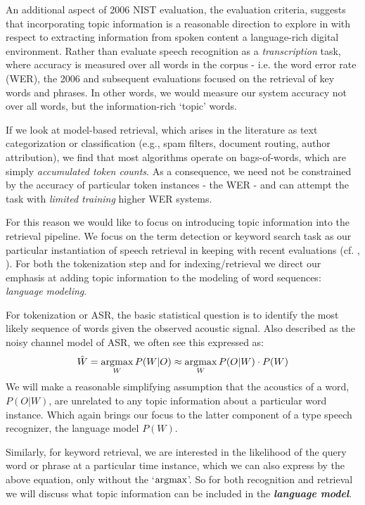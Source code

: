An additional aspect of 2006 NIST evaluation, the evaluation criteria, suggests that incorporating topic information is a reasonable direction to explore in with respect to extracting information from spoken content a language-rich digital environment.  Rather than evaluate speech recognition as a \textit{transcription} task, where accuracy is measured over all words in the corpus - i.e. the word error rate (WER), the 2006 and subsequent evaluations focused on the retrieval of key words and phrases.  In other words, we would measure our system accuracy not over all words, but the information-rich `topic' words.

If we look at model-based retrieval, which arises in the literature as text categorization or classification (e.g., spam filters, document routing, author attribution), we find that most algorithms operate on bags-of-words, which are simply \textit{accumulated token counts}.   As a consequence, we need not be constrained by the accuracy of particular token instances - the WER - and can attempt the task with \textit{limited training} higher WER systems.

For this reason we would like to focus on introducing topic information into the retrieval pipeline.   We focus on the term detection or keyword search task as our particular instantiation of speech retrieval in keeping with recent evaluations (cf. \cite{std06eval}, \cite{babel}).   For both the tokenization step and for indexing/retrieval we direct our emphasis at adding topic information to the modeling of word sequences: \textit{language modeling}.

For tokenization or ASR, the basic statistical question is to identify the most likely sequence of words given the observed acoustic signal.  Also described as the noisy channel model of ASR, we often see this expressed as:
\begin{equation}
\hat{W} = \operatorname*{\arg\!\max}_{W} P(W|O) \approx \operatorname*{\arg\!\max}_{W} P(O|W)\cdot P(W)
\end{equation}
We will make a reasonable simplifying assumption that the acoustics of a word, $P(O|W)$, are unrelated to any topic information about a particular word instance.  Which again brings our focus to the latter component of a type speech recognizer, the language model $P(W)$.

Similarly, for keyword retrieval, we are interested in the likelihood of the query word or phrase at a particular time instance, which we can also express by the above equation, only without the `$\operatorname*{\arg\!\max}$'.  So for both recognition and retrieval we will discuss what topic information can be included in the \textit{\textbf{language model}}.

